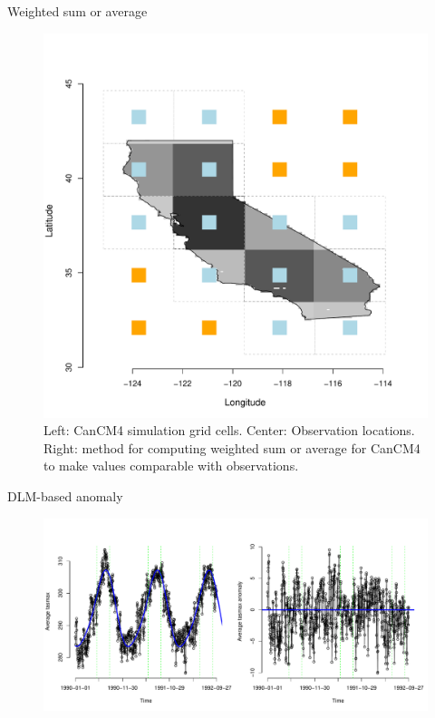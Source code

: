 \documentclass[mathserif, 11pt, t]{beamer}
\begin{document}
\begin{frame}{Weighted sum or average}
\begin{figure}
\begin{center}
\includegraphics[scale=0.18]{figs/cal_mod_box3.pdf}
\end{center}
\caption{Left: CanCM4 simulation grid cells. Center: Observation locations. Right: method for computing weighted sum or average for CanCM4 to make values comparable with observations.}
\end{figure}

\end{frame}



\begin{frame}{DLM-based anomaly}
\begin{figure}
\begin{center}
\includegraphics[scale=0.38]{figs/dlm.pdf}
\end{center}
\end{figure}
\end{frame}
\end{document}
